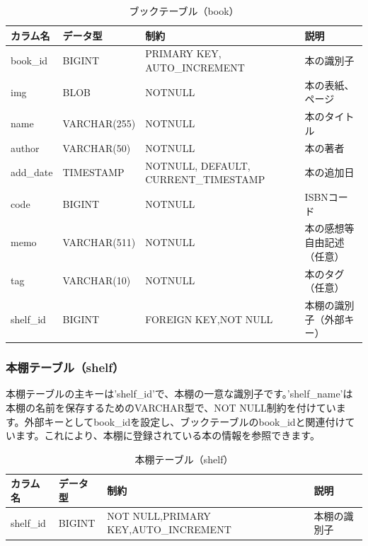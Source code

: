 \documentclass[a4paper, 11pt, titlepage]{jsarticle}
\begin{document}
\begin{table}[htbp]
  \centering
  \begin{tabular}{|l|l|>{\centering\arraybackslash}m{4cm}|>{\centering\arraybackslash}m{3cm}|}
    \hline
    \textbf{カラム名} & \textbf{データ型} & \textbf{制約} & \textbf{説明} \\
    \hline\hline
    book\_id & BIGINT & PRIMARY KEY, AUTO\_INCREMENT & 本の識別子 \\
    \hline
    img & BLOB & NOTNULL & 本の表紙、ページ \\
    \hline
    name & VARCHAR(255) & NOTNULL & 本のタイトル \\
    \hline
    author & VARCHAR(50) & NOTNULL & 本の著者 \\
    \hline
    add\_date & TIMESTAMP & NOTNULL, DEFAULT, CURRENT\_TIMESTAMP & 本の追加日 \\
    \hline
    code & BIGINT & NOTNULL & ISBNコード \\
    \hline
    memo & VARCHAR(511) & NOTNULL & 本の感想等自由記述（任意） \\
    \hline
    tag & VARCHAR(10) & NOTNULL & 本のタグ（任意） \\
    \hline
    shelf\_id & BIGINT & FOREIGN KEY,NOT NULL & 本棚の識別子（外部キー） \\
    \hline
  \end{tabular}
  \caption{ブックテーブル（book）}
  \label{tab:booktable}
\end{table}

\subsubsection{本棚テーブル（shelf）}
本棚テーブルの主キーは'shelf\_id'で、本棚の一意な識別子です。'shelf\_name'は本棚の名前を保存するためのVARCHAR型で、NOT NULL制約を付けています。外部キーとしてbook\_idを設定し、ブックテーブルのbook\_idと関連付けています。これにより、本棚に登録されている本の情報を参照できます。
\begin{table}[htbp]
  \centering
  \begin{tabular}{|l|l|>{\centering\arraybackslash}m{4cm}|>{\centering\arraybackslash}m{3cm}|}
    \hline
    \textbf{カラム名} & \textbf{データ型} & \textbf{制約} & \textbf{説明} \\
    \hline\hline
    shelf\_id & BIGINT & NOT NULL,PRIMARY KEY,AUTO\_INCREMENT& 本棚の識別子 \\
    \hline
  \end{tabular}
  \caption{本棚テーブル（shelf）}
  \label{tab:shelftable}
\end{table}
\end{document}
